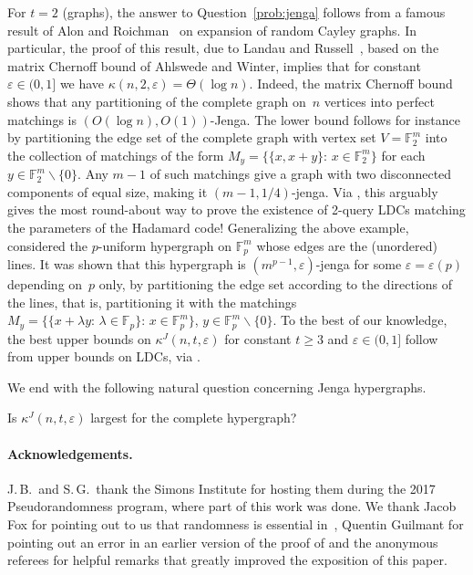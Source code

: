 \documentclass{toc}
\newcommand{\st}{:\,} %
\newcommand{\eps}{\varepsilon}
\newcommand{\F}{{\mathbb{F}}}
\begin{document}
For $t = 2$ (graphs), the answer to Question~\ref{prob:jenga} follows from
%
a famous result  %
of Alon and Roichman~\cite{Alon:1994a} on expansion of random Cayley
%
%
%
graphs.  In particular, the  %
%
proof of this result, due to Landau and Russell~\cite{Landau:2004}, %
based on the matrix Chernoff bound of Ahlswede and Winter,  %
%
implies that for constant $\eps\in (0,1]$ %
we have $\kappa(n, 2,\eps) = \Theta(\log n)$.
Indeed, the matrix Chernoff bound shows that any partitioning of the complete graph on~$n$ vertices into perfect matchings is $(O(\log n),O(1))$-Jenga.
The lower bound follows for instance by partitioning the edge set of the complete graph with vertex set $V = \F_2^m$ into the collection of matchings of the form $M_y = \big\{\{x, x+y\} \st x\in \F_2^m\big\}$ for each $y\in \F_2^m\smallsetminus\{0\}$.
Any $m-1$ of such matchings give a graph with two disconnected components of equal size, making it $(m-1, 1/4)$-jenga.
Via , this arguably gives the most round-about way to prove the existence of 2-query LDCs matching the parameters of the Hadamard code!
Generalizing the above example, \cite{BrietRao:2016} considered the $p$-uniform hypergraph on $\F_p^m$ whose edges are the (unordered)  lines. %
It was shown that this hypergraph is $(m^{p-1}, \eps)$-jenga for some $\eps =  \eps(p)$ depending on~$p$ only, by partitioning the edge set according to the directions of the lines, that is, partitioning it with the matchings $M_y = \big\{\{x + \lambda y\st \lambda\in \F_p\} \st x\in \F_p^m\big\}$, $y\in \F_p^m\smallsetminus\{0\}$.
To the best of our knowledge, the best upper bounds on $\kappa^J(n,t,\eps)$ for constant $t\geq 3$ and $\eps \in (0,1]$ follow from upper bounds on LDCs, via .

We end with the following natural question concerning Jenga hypergraphs.

\begin{question}
Is $\kappa^J(n,t,\eps)$ largest for the complete hypergraph?
\end{question}

%
\paragraph{Acknowledgements.}
J.\,B.\ and S.\,G.\ thank the Simons Institute for hosting them during the 2017 Pseudorandomness program, where part of this work was done.
We thank Jacob Fox for pointing out to us that randomness is essential in~, Quentin Guilmant for pointing out an error in an earlier version of the proof of  and the anonymous referees for helpful remarks that greatly improved the exposition of this paper.
\end{document}
